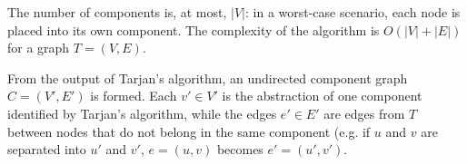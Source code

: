 \documentclass[conference]{IEEEtran}
\begin{document}



%


The number of components is, at most, $|V|$: in a worst-case scenario, each node is placed into its own component.
The complexity of the algorithm is $O(|V|+|E|)$ for a graph $T = (V,E)$.


From the output of Tarjan's algorithm, an undirected component graph $C = (V',E')$ is formed.
Each $v' \in V'$ is the abstraction of one component identified by Tarjan's algorithm, while the edges $e' \in E'$ are edges from $T$ between nodes that do not belong in the same component (e.g. if $u$ and $v$ are separated into $u'$ and $v'$, $e = (u,v)$ becomes $e'=(u',v')$.
\end{document}
